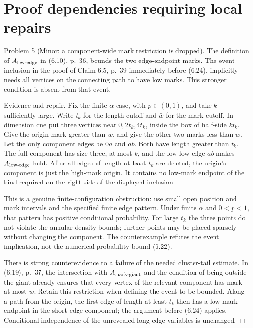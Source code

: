 \documentclass[10pt]{article}
\begin{document}
\section*{Proof dependencies requiring local repairs}
Problem 5 (Minor: a component-wide mark restriction is dropped).  The definition of \(A_{\rm low\text{-}edge}\) in (6.10), p. 36, bounds the two edge-endpoint marks. The event inclusion in the proof of Claim 6.5, p. 39 immediately before (6.24), implicitly needs all vertices on the connecting path to have low marks. This stronger condition is absent from that event.\par
Evidence and repair. Fix the finite-\(\alpha\) case, with \(p\in(0,1)\), and take \(k\) sufficiently large. Write \(t_k\) for the length cutoff and \(\bar w\) for the mark cutoff. In dimension one put three vertices near \(0,2t_k,4t_k\), inside the box of half-side \(k t_k\). Give the origin mark greater than \(\bar w\), and give the other two marks less than \(\bar w\). Let the only component edges be \(0a\) and \(ab\). Both have length greater than \(t_k\). The full component has size three, at most \(k\), and the low-low edge \(ab\) makes \(A_{\rm low\text{-}edge}\) hold. After all edges of length at least \(t_k\) are deleted, the origin’s component is just the high-mark origin. It contains no low-mark endpoint of the kind required on the right side of the displayed inclusion.\par
This is a genuine finite-configuration obstruction: use small open position and mark intervals and the specified finite edge pattern. Under finite \(\alpha\) and \(0<p<1\), that pattern has positive conditional probability. For large \(t_k\) the three points do not violate the annular density bounds; further points may be placed sparsely without changing the component. The counterexample refutes the event implication, not the numerical probability bound (6.22).\par
There is strong counterevidence to a failure of the needed cluster-tail estimate. In (6.19), p. 37, the intersection with \(A_{\rm mark\text{-}giant}\) and the condition of being outside the giant already ensures that every vertex of the relevant component has mark at most \(\bar w\). Retain this restriction when defining the event to be bounded. Along a path from the origin, the first edge of length at least \(t_k\) then has a low-mark endpoint in the short-edge component; the argument before (6.24) applies. Conditional independence of the unrevealed long-edge variables is unchanged. ◻\par
\end{document}
